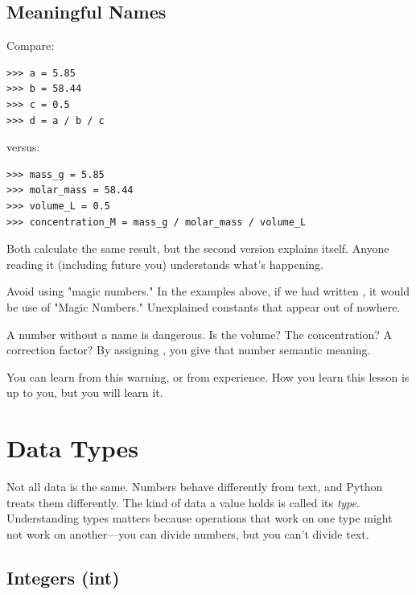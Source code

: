 \subsection{Meaningful Names}

Compare:

\begin{lstlisting}
>>> a = 5.85
>>> b = 58.44
>>> c = 0.5
>>> d = a / b / c
\end{lstlisting}

versus:

\begin{lstlisting}
>>> mass_g = 5.85
>>> molar_mass = 58.44
>>> volume_L = 0.5
>>> concentration_M = mass_g / molar_mass / volume_L
\end{lstlisting}

Both calculate the same result, but the second version explains itself. Anyone reading it (including future you) understands what's happening.

\begin{warning}
Avoid using "magic numbers." In the examples above, if we had written , it would be use of "Magic Numbers." Unexplained constants that appear out of nowhere. 

A number without a name is dangerous. Is  the volume? The concentration? A correction factor? By assigning , you give that number semantic meaning.


You can learn from this warning, or from experience. How you learn this lesson is up to you, but you will learn it.
\end{warning}

\section{Data Types}
\label{sec:types}

Not all data is the same. Numbers behave differently from text, and Python treats them differently. The kind of data a value holds is called its \emph{type}. Understanding types matters because operations that work on one type might not work on another---you can divide numbers, but you can't divide text.

\subsection{Integers (int)}

